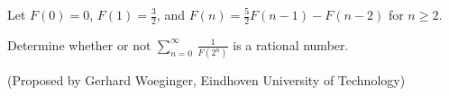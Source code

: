 Let $F(0)=0$, $F(1)=\frac32$, and $F(n)=\frac{5}{2}F(n-1)-F(n-2)$
for $n\ge2$.

Determine whether or not $\displaystyle{\sum_{n=0}^{\infty}\,
    \frac{1}{F(2^n)}}$ is a rational number.

(Proposed by Gerhard Woeginger, Eindhoven University of Technology)